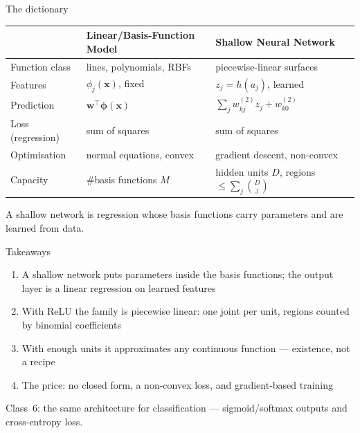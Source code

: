 \documentclass[aspectratio=169, 11pt]{beamer}
\begin{document}
\begin{frame}{The dictionary}
  \centering
  \renewcommand{\arraystretch}{1.12}
  {\footnotesize
  \begin{tabular}{p{} p{}
                  p{}}
    & \textbf{\color{mlc}Linear/Basis-Function Model}
    & \textbf{\color{nnc}Shallow Neural Network}\\
    \hline
    Function class
      & lines, polynomials, RBFs
      & piecewise-linear surfaces\\
    Features
      & $\phi_j(\mathbf{x})$, fixed
      & $z_j=h(a_j)$, learned\\
    Prediction
      & $\mathbf{w}^{\!\top}\boldsymbol{\phi}(\mathbf{x})$
      & $\sum_j w_{kj}^{(2)} z_j + w_{k0}^{(2)}$\\
    Loss (regression)
      & sum of squares
      & sum of squares\\
    Optimisation
      & normal equations, convex
      & gradient descent, non-convex\\
    Capacity
      & \#basis functions $M$
      & hidden units $D$, regions
        $\le\sum_j\binom{D}{j}$\\
    \hline
  \end{tabular}}
  \vspace{0.5em}
  \begin{redhighlight}
    A shallow network is regression whose basis functions
    carry parameters and are learned from data.
  \end{redhighlight}
\end{frame}

\begin{frame}{Takeaways}
  \begin{enumerate}
    \item A shallow network puts parameters inside the
          basis functions; the output layer is a
          \alert{linear regression on learned features}
    \item With ReLU the family is \alert{piecewise
          linear}: one joint per unit, regions counted by
          binomial coefficients
    \item With enough units it approximates \alert{any
          continuous function} --- existence, not a
          recipe
    \item The price: \alert{no closed form}, a non-convex
          loss, and gradient-based training
  \end{enumerate}
  \vspace{0.4em}
  \begin{redhighlight}
    Class~6: the same architecture for
    \alert{classification} --- sigmoid/softmax outputs and
    cross-entropy loss.
  \end{redhighlight}
\end{frame}
\end{document}
